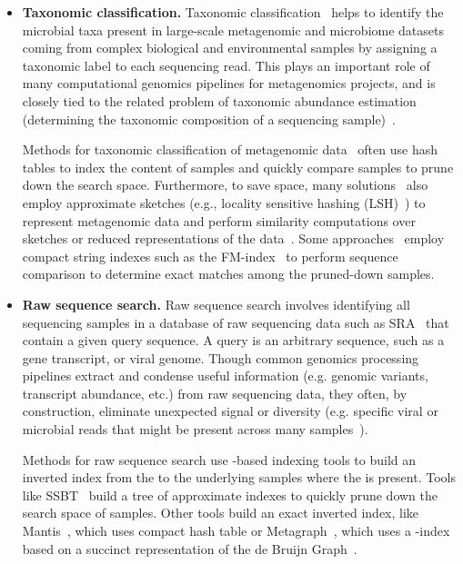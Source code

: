 \begin{itemize}[leftmargin=*]

\item \textbf{Taxonomic classification.} Taxonomic classification~\cite{wood2014kraken} helps to identify the microbial taxa present in large-scale metagenomic and microbiome datasets coming from complex biological and environmental samples by assigning a taxonomic label to each sequencing read. This plays an important role of many computational genomics pipelines for metagenomics projects, and is closely tied to the related problem of taxonomic abundance estimation (determining the taxonomic composition of a sequencing sample)~\cite{truong2015metaphlan2,skoufos2022agamemnon,wei2022kmcp}.

Methods for taxonomic classification of metagenomic data~\cite{wood2014kraken} often use hash tables to index the \kmer content of samples and quickly compare samples to prune down the search space.
Furthermore, to save space, many solutions~\cite{wood2019improved} also employ approximate sketches (e.g., locality sensitive hashing (LSH)~\cite{roberts2004reducing}) to represent metagenomic data and perform similarity computations over sketches or reduced representations of the data~\cite{Shaw2023}.
Some approaches~\cite{kim2016centrifuge} employ compact string indexes such as the FM-index~\cite{ferragina2000opportunistic} to perform sequence comparison to determine exact matches among the pruned-down samples.

\item \textbf{Raw sequence search.} Raw sequence search involves identifying all sequencing samples in a database of raw sequencing data such as SRA~\cite{kodama2012sequence} that contain a given query sequence. A query is an arbitrary sequence, such as a gene transcript, or viral genome. Though common genomics processing pipelines extract and condense useful information (e.g. genomic variants, transcript abundance, etc.) from raw sequencing data, they often, by construction, eliminate unexpected signal or diversity (e.g. specific viral or microbial reads that might be present across many samples~\cite{Edgar2022}).

Methods for raw sequence search use \kmer-based indexing tools to build an inverted index from the \kmers to the underlying samples where the \kmer is present. Tools like SSBT~\cite{solomon2016fast} build a tree of approximate \kmer indexes to quickly prune down the search space of samples. Other tools build an exact inverted index, like Mantis~\cite{PandeyABFJP18Cell}, which uses compact hash table or Metagraph~\cite{Karasikov2020}, which uses a \kmer-index based on a succinct representation of the de Bruijn Graph~\cite{bowe2012succinct}.


\end{itemize}
